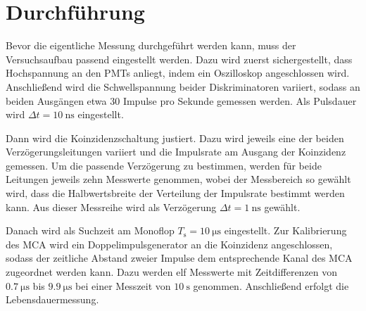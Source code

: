 \section{Durchführung}
Bevor die eigentliche Messung durchgeführt werden kann, muss der Versuchsaufbau passend eingestellt werden.
Dazu wird zuerst sichergestellt, dass Hochspannung an den PMTs anliegt, indem ein Oszilloskop angeschlossen
wird. Anschließend wird die Schwellspannung beider Diskriminatoren variiert, sodass an beiden Ausgängen
etwa 30 Impulse pro Sekunde gemessen werden. Als Pulsdauer wird $\Delta t = \SI{10}{\nano\second}$ eingestellt.

Dann wird die Koinzidenzschaltung justiert. Dazu wird jeweils eine der beiden Verzögerungsleitungen 
variiert und die Impulsrate am Ausgang der Koinzidenz gemessen. Um die passende Verzögerung zu bestimmen, werden
für beide Leitungen jeweils zehn Messwerte genommen, wobei der Messbereich so gewählt wird, dass die Halbwertsbreite 
der Verteilung der Impulsrate bestimmt werden kann. Aus dieser Messreihe wird als Verzögerung $\Delta t = \SI{1}{\nano\second}$
gewählt. 

Danach wird als Suchzeit am Monoflop $T_\text{s} = \SI{10}{\micro\second}$ eingestellt. Zur Kalibrierung des 
MCA wird ein Doppelimpulsgenerator an die Koinzidenz angeschlossen, sodass der zeitliche Abstand zweier 
Impulse dem entsprechende Kanal des MCA zugeordnet werden kann. Dazu werden elf Messwerte mit Zeitdifferenzen
von $\SI{0.7}{\micro\second}$ bis $\SI{9.9}{\micro\second}$ bei einer Messzeit von $\SI{10}{\second}$ genommen.
Anschließend erfolgt die Lebensdauermessung.